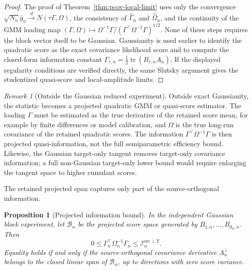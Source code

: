 \documentclass[11pt,a4paper]{amsart}
\theoremstyle{plain}
\newtheorem{proposition}[theorem]{Proposition}
\theoremstyle{definition}
\theoremstyle{remark}
\newtheorem{remark}[theorem]{Remark}
\DeclareMathOperator{\tr}{tr}
\newcommand{\toD}{\xrightarrow{d}}
\newcommand{\scrB}{\mathcal{B}}
\newcommand{\scrI}{\mathcal{I}}
\begin{document}
\begin{proof}
The proof of Theorem~\ref{thm:pcov-local-limit} uses only the convergence
\(\sqrt{N_n}\bar g_n\toD N(\tau\Gamma,\Omega)\), the consistency of
\(\widehat\Gamma_n\) and \(\widehat\Omega_n\), and the continuity of the GMM loading map
\((\Gamma,\Omega)\mapsto\Omega^{-1}\Gamma/(\Gamma^\top\Omega^{-1}\Gamma)^{1/2}\).  None of these
steps requires the block vector itself to be Gaussian.  Gaussianity is used earlier to identify the
quadratic score as the exact covariance likelihood score and to compute the closed-form information
constant \(\Gamma_{r,n}=\frac12\tr(B_{r,n}A_n)\).  If the displayed regularity conditions are
verified directly, the same Slutsky argument gives the studentized quasi-score and local-amplitude
limits.
\end{proof}

\begin{remark}[Outside the Gaussian reduced experiment]
Outside exact Gaussianity, the statistic becomes a projected quadratic GMM or quasi-score
estimator.  The loading \(\Gamma\) must be estimated as the true derivative of the retained score
mean, for example by finite differences or model calibration, and \(\Omega\) is the true long-run
covariance of the retained quadratic scores.  The information
\(\Gamma^\top\Omega^{-1}\Gamma\) is then projected quasi-information, not the full
semiparametric efficiency bound.  Likewise, the Gaussian target-only tangent removes target-only
covariance information; a full non-Gaussian target-only lower bound would require enlarging the
tangent space to higher cumulant scores.
\end{remark}

The retained projected span captures only part of the source-orthogonal information.

\begin{proposition}[Projected information bound]\label{prop:pcov-info-bound}
In the independent Gaussian block experiment, let \(\scrB_n\) be the projected score space generated
by \(B_{1,n},\dots,B_{d_n,n}\).  Then
\[
        0\le
        \Gamma_n^\top\Omega_n^{-1}\Gamma_n
        \le
        \scrI_n^{\mathrm{src}\perp Y}.
\]
Equality holds if and only if the source-orthogonal covariance derivative \(A_n^\perp\) belongs to
the closed linear span of \(\scrB_n\), up to directions with zero score variance.
\end{proposition}
\end{document}
